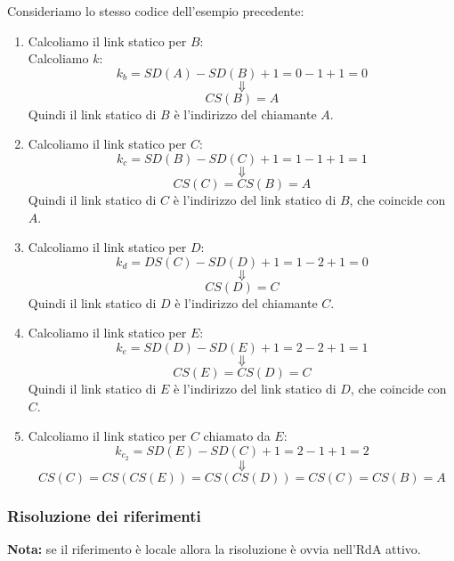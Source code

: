 \documentclass[a4paper]{article}
\begin{document}
\begin{example}
  Consideriamo lo stesso codice dell'esempio precedente:
  \begin{enumerate}
    \item 
      Calcoliamo il link statico per \( B \):\\
      Calcoliamo \( k \):
      \[
        k_b = SD(A) - SD(B) + 1 = 0 - 1 + 1 = 0
      \] 
      \[
        \Downarrow
      \] 
      \[
        CS(B) = A
      \] 
      Quindi il link statico di \( B \) è l'indirizzo del chiamante \( A \).

    \item Calcoliamo il link statico per \( C \):
      \[
        k_c = SD(B) - SD(C) + 1 = 1 - 1 + 1 = 1
      \] 
      \[
        \Downarrow
      \] 
      \[
        CS(C) = CS(B) = A
      \] 
      Quindi il link statico di \( C \) è l'indirizzo del link statico di \( B \), che
      coincide con \( A \).

    \item Calcoliamo il link statico per \( D \):
      \[
        k_d = DS(C) - SD(D) + 1 = 1 - 2 + 1 = 0
      \] 
      \[
        \Downarrow
      \] 
      \[
        CS(D) = C
      \] 
      Quindi il link statico di \( D \) è l'indirizzo del chiamante \( C \).

    \item Calcoliamo il link statico per \( E \):
      \[
        k_e = SD(D) - SD(E) + 1 = 2 - 2 + 1 = 1
      \] 
      \[
        \Downarrow
      \] 
      \[
        CS(E) = CS(D) = C
      \] 
      Quindi il link statico di \( E \) è l'indirizzo del link statico di \( D \), che
      coincide con \( C \).

    \item Calcoliamo il link statico per \( C \) chiamato da \( E \):
      \[
        k_{c_2} =SD(E) - SD(C) + 1 = 2 - 1 + 1 = 2
      \] 
      \[
        \Downarrow
      \] 
      \[
        CS(C) = CS(CS(E)) = CS(CS(D)) = CS(C) = CS(B) = A
      \] 
  \end{enumerate}
\end{example}


\subsubsection*{Risoluzione dei riferimenti}
\textbf{Nota:} se il riferimento è locale allora la risoluzione è ovvia nell'RdA
attivo.
\end{document}
